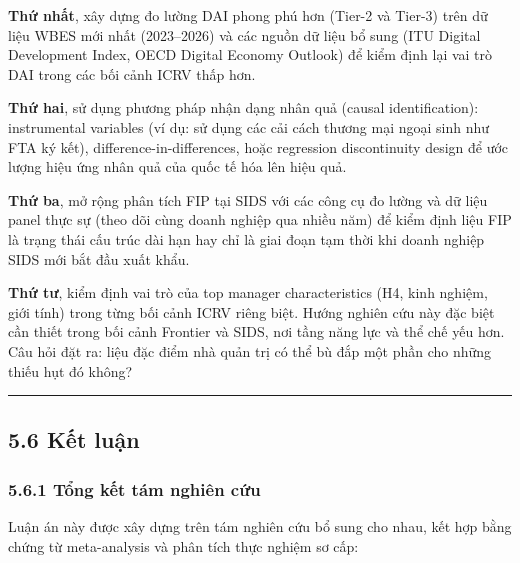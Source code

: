 \documentclass[12pt,a4paper]{article}
\begin{document}
\textbf{Thứ nhất}, xây dựng đo lường DAI phong phú hơn (Tier-2 và
Tier-3) trên dữ liệu WBES mới nhất (2023--2026) và các nguồn dữ liệu bổ
sung (ITU Digital Development Index, OECD Digital Economy Outlook) để
kiểm định lại vai trò DAI trong các bối cảnh ICRV thấp hơn.

\textbf{Thứ hai}, sử dụng phương pháp nhận dạng nhân quả (causal
identification): instrumental variables (ví dụ: sử dụng các cải cách
thương mại ngoại sinh như FTA ký kết), difference-in-differences, hoặc
regression discontinuity design để ước lượng hiệu ứng nhân quả của quốc
tế hóa lên hiệu quả.

\textbf{Thứ ba}, mở rộng phân tích FIP tại SIDS với các công cụ đo lường
và dữ liệu panel thực sự (theo dõi cùng doanh nghiệp qua nhiều năm) để
kiểm định liệu FIP là trạng thái cấu trúc dài hạn hay chỉ là giai đoạn
tạm thời khi doanh nghiệp SIDS mới bắt đầu xuất khẩu.

\textbf{Thứ tư}, kiểm định vai trò của top manager characteristics (H4,
kinh nghiệm, giới tính) trong từng bối cảnh ICRV riêng biệt. Hướng
nghiên cứu này đặc biệt cần thiết trong bối cảnh Frontier và SIDS, nơi
tầng năng lực và thể chế yếu hơn. Câu hỏi đặt ra: liệu đặc điểm nhà quản
trị có thể bù đắp một phần cho những thiếu hụt đó không?

\begin{center}\rule{0.5\linewidth}{0.5pt}\end{center}

\hypertarget{56-kux1ebft-luux1eadn}{%
\subsection{5.6 Kết luận}\label{56-kux1ebft-luux1eadn}}

\hypertarget{561-tux1ed5ng-kux1ebft-tuxe1m-nghiuxean-cux1ee9u}{%
\subsubsection{5.6.1 Tổng kết tám nghiên
cứu}\label{561-tux1ed5ng-kux1ebft-tuxe1m-nghiuxean-cux1ee9u}}

Luận án này được xây dựng trên tám nghiên cứu bổ sung cho nhau, kết hợp
bằng chứng từ meta-analysis và phân tích thực nghiệm sơ cấp:
\end{document}
